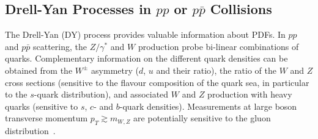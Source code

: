 %




\subsection{Drell-Yan Processes in $pp$ or $p\bar p$ Collisions}
\label{dysection}

The Drell-Yan (DY) process
provides valuable information about PDFs.
In $pp$ and $p\bar p$ scattering, the $Z/\gamma^*$ and $W$ production 
probe bi-linear combinations of quarks. 
Complementary information on the different quark densities
can be obtained from the $W^{\pm}$ asymmetry ($d$, $u$ and their ratio),
the ratio of the $W$ and $Z$ cross sections (sensitive to the flavour 
composition of the quark sea, in particular to the $s$-quark distribution), 
and associated $W$ and $Z$ production with
heavy quarks (sensitive to $s$, $c$- and $b$-quark densities).
 Measurements at large boson transverse momentum $p_T\gtrsim m_{W,Z}$ are potentially sensitive to the gluon 
distribution~\cite{Malik:2013kba}.
%

